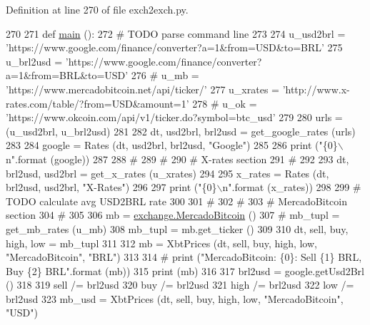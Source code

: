 Definition at line 270 of file exch2exch.\-py.


\begin{DoxyCode}
270 
271 \textcolor{keyword}{def }\hyperlink{namespaceexch2exch_a559f55b08d308a647cc4afa3620e2da8}{main} ():
272     \textcolor{comment}{# TODO parse command line }
273 
274     u\_usd2brl = \textcolor{stringliteral}{'https://www.google.com/finance/converter?a=1&from=USD&to=BRL'}
275     u\_brl2usd = \textcolor{stringliteral}{'https://www.google.com/finance/converter?a=1&from=BRL&to=USD'}
276 \textcolor{comment}{#    u\_mb      = 'https://www.mercadobitcoin.net/api/ticker/'}
277     u\_xrates  = \textcolor{stringliteral}{'http://www.x-rates.com/table/?from=USD&amount=1'}
278 \textcolor{comment}{#    u\_ok      = 'https://www.okcoin.com/api/v1/ticker.do?symbol=btc\_usd'}
279     
280     urls = (u\_usd2brl, u\_brl2usd)
281     
282     dt, usd2brl, brl2usd = get\_google\_rates (urls)
283     
284     google = Rates (dt, usd2brl, brl2usd, \textcolor{stringliteral}{"Google"})
285     
286     \textcolor{keywordflow}{print} (\textcolor{stringliteral}{"\{0\}\(\backslash\)n"}.format (google))
287     
288     \textcolor{comment}{#}
289     \textcolor{comment}{#}
290     \textcolor{comment}{# X-rates section }
291     \textcolor{comment}{# }
292     
293     dt, brl2usd, usd2brl = get\_x\_rates (u\_xrates)
294     
295     x\_rates = Rates (dt, brl2usd, usd2brl, \textcolor{stringliteral}{"X-Rates"})
296     
297     \textcolor{keywordflow}{print} (\textcolor{stringliteral}{"\{0\}\(\backslash\)n"}.format (x\_rates))
298     
299     \textcolor{comment}{# TODO calculate avg USD2BRL rate}
300     
301     \textcolor{comment}{#}
302     \textcolor{comment}{#}
303     \textcolor{comment}{# MercadoBitcoin section }
304     \textcolor{comment}{# }
305     
306     mb = \hyperlink{classexchange_1_1_mercado_bitcoin}{exchange.MercadoBitcoin} ()    
307 \textcolor{comment}{#    mb\_tupl = get\_mb\_rates (u\_mb)}
308     mb\_tupl = mb.get\_ticker ()
309     
310     dt, sell, buy, high, low = mb\_tupl
311     
312     mb = XbtPrices (dt, sell, buy, high, low, \textcolor{stringliteral}{"MercadoBitcoin"}, \textcolor{stringliteral}{"BRL"})
313     
314     \textcolor{comment}{# print ("MercadoBitcoin: \{0\}: Sell \{1\} BRL, Buy \{2\} BRL".format (mb))}
315     \textcolor{keywordflow}{print} (mb)
316      
317     brl2usd = google.getUsd2Brl ()
318     
319     sell /= brl2usd
320     buy  /= brl2usd 
321     high /= brl2usd
322     low  /= brl2usd 
323     mb\_usd = XbtPrices (dt, sell, buy, high, low, \textcolor{stringliteral}{"MercadoBitcoin"}, \textcolor{stringliteral}{"USD"})

\end{DoxyCode}
